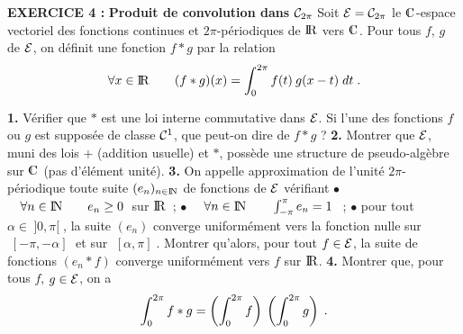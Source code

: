 \documentclass{article}
\begin{document}
\eject


{\bf EXERCICE 4 :}\msk
{\bf Produit de convolution dans} ${\cal C}_{2\pi}$\msk
Soit ${\cal E}={\cal C}_{2\pi}$ le $\cmat$-espace vectoriel des fonctions continues
et $2\pi$-p\'eriodiques de
${\rm I\kern-0.6mm R}$ vers $\cmat$. Pour tous $f$, $g$ de ${\cal E}$, on d\'efinit une fonction
$f*g$ par la relation\vv
$$\forall x\in{\rm I\kern-0.6mm R}\qquad (f*g)(x)=\int_0^{2\pi}f(t)\>g(x-t)\;dt\;.$$\par
{\bf 1.} V\'erifier que $*$ est une loi interne commutative dans ${\cal E}$.\pn
Si l'une des fonctions $f$ ou $g$ est suppos\'ee de classe ${\cal C}^1$,
que peut-on dire de $f*g$ ?\msk
{\bf 2.} Montrer que ${\cal E}$, muni des lois $+$ (addition usuelle) et $*$,
poss\`ede une structure de pseudo-alg\`ebre sur $\cmat$ (pas d'\'el\'ement unit\'e).\msk
{\bf 3.} On appelle {\itbf approximation de l'unit\'e $2\pi$-p\'eriodique} toute suite
$(e_n)_{n\in{\rm I\kern-0.5mm N}}$ de fonctions de ${\cal E}$ v\'erifiant\ssk\sect
$\bullet$ $\quad \forall n\in{\rm I\kern-0.5mm N}\qquad e_n\ge0\;$ sur ${\rm I\kern-0.6mm R}$~;\ssk\sect
$\bullet$ $\quad \forall n\in{\rm I\kern-0.5mm N}\qquad \int_{-\pi}^{\pi}e_n=1\;$~; \ssk\sect
$\bullet$ \quad pour tout $\alpha\in\>]0,\pi[\;$, la suite $(e_n)$
               converge uniform\'ement vers la fonction nulle sur
                $\;[-\pi,-\alpha]\;$ et sur $\;[\alpha,\pi]\;$.\msk\sect
Montrer qu'alors, pour tout $f\in {\cal E}$, la suite de fonctions $(e_n*f)$
converge uniform\'ement vers $f$ sur ${\rm I\kern-0.6mm R}$.\msk
{\bf 4.} Montrer que, pour tous $f$, $g\in {\cal E}$, on a\vv
$$\int_0^{2\pi}f*g=\left(\int_0^{2\pi}f\right)\>\left(\int_0^{2\pi}g\right)\;.$$

\msk
\cl{- - - - - - - - - - - - - - - - - - - - - - - - - - - - - -}
\msk
\end{document}
